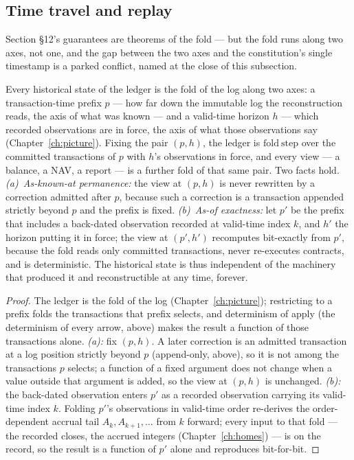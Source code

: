 \subsection{Time travel and replay}

Section \S 12's guarantees are theorems of the fold --- but the fold runs along two axes,
not one, and the gap between the two axes and the constitution's single timestamp is a
parked conflict, named at the close of this subsection.

\begin{theorem}\label{thm:timetravel}
Every historical state of the ledger is the fold of the log along two axes: a
transaction-time prefix $p$ --- how far down the immutable log the reconstruction reads,
the axis of what was known --- and a valid-time horizon $h$ --- which recorded observations
are in force, the axis of what those observations say (Chapter~\ref{ch:picture}). Fixing
the pair $(p,h)$, the ledger is $\mathrm{fold\ step}$ over the committed transactions of
$p$ with $h$'s observations in force, and every view --- a balance, a NAV, a report --- is
a further fold of that same pair. Two facts hold.
\emph{(a)~As-known-at permanence:} the view at $(p,h)$ is never rewritten by a correction
admitted after $p$, because such a correction is a transaction appended strictly beyond $p$
and the prefix is fixed.
\emph{(b)~As-of exactness:} let $p'$ be the prefix that includes a back-dated observation
recorded at valid-time index $k$, and $h'$ the horizon putting it in force; the view at
$(p',h')$ recomputes bit-exactly from $p'$, because the fold reads only committed
transactions, never re-executes contracts, and is deterministic. The historical state is
thus independent of the machinery that produced it and reconstructible at any time, forever.
\end{theorem}

\begin{proof}
The ledger is the fold of the log (Chapter~\ref{ch:picture}); restricting to a prefix folds
the transactions that prefix selects, and determinism of apply (the determinism of every
arrow, above) makes the result a function of those transactions alone. \emph{(a):} fix
$(p,h)$. A later correction is an admitted transaction at a log position strictly beyond $p$
(append-only, above), so it is not among the transactions $p$ selects; a function of a fixed
argument does not change when a value outside that argument is added, so the view at $(p,h)$
is unchanged. \emph{(b):} the back-dated observation enters $p'$ as a recorded observation
carrying its valid-time index $k$. Folding $p'$'s observations in valid-time order re-derives
the order-dependent accrual tail $A_k, A_{k+1}, \dots$ from $k$ forward; every input to that
fold --- the recorded closes, the accrued integers (Chapter~\ref{ch:homes}) --- is on the
record, so the result is a function of $p'$ alone and reproduces bit-for-bit.
\end{proof}

